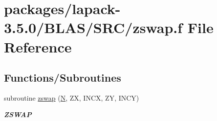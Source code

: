 \hypertarget{lapack-3_85_80_2BLAS_2SRC_2zswap_8f}{}\section{packages/lapack-\/3.5.0/\+B\+L\+A\+S/\+S\+R\+C/zswap.f File Reference}
\label{lapack-3_85_80_2BLAS_2SRC_2zswap_8f}
\subsection*{Functions/\+Subroutines}
\begin{DoxyCompactItemize}
\item 
subroutine \hyperlink{group__complex16__blas__level1_ga13a187010a0cae1fef2820072404e857}{zswap} (\hyperlink{polmisc_8c_a0240ac851181b84ac374872dc5434ee4}{N}, Z\+X, I\+N\+C\+X, Z\+Y, I\+N\+C\+Y)
\begin{DoxyCompactList}\small\item\em {\bfseries Z\+S\+W\+A\+P} \end{DoxyCompactList}\end{DoxyCompactItemize}
